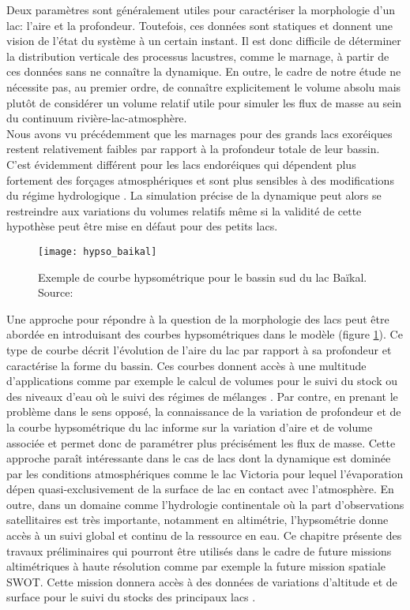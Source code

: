 Deux paramètres sont généralement utiles pour caractériser la morphologie d'un lac: l'aire et la profondeur. Toutefois, ces données sont statiques et donnent une vision de l'état du système à un certain instant. Il est donc difficile de déterminer la distribution verticale des processus lacustres, comme le marnage, à partir de ces données sans ne connaître la dynamique. En outre, le cadre de notre étude ne nécessite pas, au premier ordre, de connaître explicitement le volume absolu mais plutôt de considérer un volume relatif utile pour simuler les flux de masse au sein du continuum rivière-lac-atmosphère. \\
Nous avons vu précédemment que les marnages pour des grands lacs exoréiques restent relativement faibles par rapport à la profondeur totale de leur bassin. C'est évidemment différent pour les lacs endoréiques qui dépendent plus fortement des forçages atmosphériques et sont plus sensibles à des modifications du régime hydrologique \citep{wurtsbaugh2017, pham2020}. La simulation précise de la dynamique peut alors se restreindre aux variations du volumes relatifs même si la validité de cette hypothèse peut être mise en défaut pour des petits lacs.\\

\begin{figure}
\centering
\texttt{[image: hypso\_baikal]}
\caption{Exemple de courbe hypsométrique pour le bassin sud du lac Baïkal. Source: \citet{piccolroaz2013}}
\label{hypso_baikal}
\end{figure}

Une approche pour répondre à la question de la morphologie des lacs peut être abordée en introduisant des courbes hypsométriques dans le modèle (figure \ref{hypso_baikal}). Ce type de courbe décrit l'évolution de l'aire du lac par rapport à sa profondeur et caractérise la forme du bassin. Ces courbes donnent accès à une multitude d'applications comme par exemple le calcul de volumes pour le suivi du stock ou des niveaux d'eau \citep{arsen2014} où le suivi des régimes de mélanges \citep{piccolroaz2013}. Par contre, en prenant le problème dans le sens opposé, la connaissance de la variation de profondeur et de la courbe hypsométrique du lac informe sur la variation d'aire et de volume associée et permet donc de paramétrer plus précisément les flux de masse. Cette approche paraît intéressante dans le cas de lacs dont la dynamique est dominée par les conditions atmosphériques comme le lac Victoria pour lequel l'évaporation dépen quasi-exclusivement de la surface de lac en contact avec l'atmosphère. En outre, dans un domaine comme l'hydrologie continentale où la part d'observations satellitaires est très importante, notamment en altimétrie, l'hypsométrie donne accès à un suivi global et continu de la ressource en eau. Ce chapitre présente des travaux préliminaires qui pourront être utilisés dans le cadre de future missions altimétriques à haute résolution comme par exemple la future mission spatiale SWOT. Cette mission donnera accès à des données de variations d'altitude et de surface pour le suivi du stocks des principaux lacs \citep{biancamaria2016}.\\


